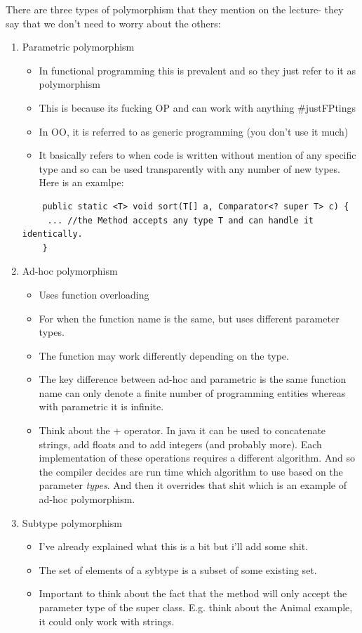 \documentclass{article}
\begin{document}
There are three types of polymorphism that they mention on the lecture- they say that we don't need
to worry about the others:

\begin{enumerate}
\item Parametric polymorphism
	\begin{itemize}
	  \item In functional programming this is prevalent and so they just refer to it as polymorphism
	  \item This is because its fucking OP and can work with anything \#justFPtings
	  \item In OO, it is referred to as generic programming (you don't use it much)
	  \item It basically refers to when code is written without mention of any specific type and so
		can be used transparently with any number of new types. Here is an examlpe:
	\end{itemize}
     \begin{lstlisting}
	public static <T> void sort(T[] a, Comparator<? super T> c) {
 	 ... //the Method accepts any type T and can handle it identically.
	}
     \end{lstlisting} 

\item Ad-hoc polymorphism
	\begin{itemize}
		\item Uses function overloading
		\item For when the function name is the same, but uses different parameter types.
		\item The function may work differently depending on the type.
		\item The key difference between ad-hoc and parametric is the same function name can only
		      denote a finite number of programming entities whereas with parametric it is infinite.
	        \item Think about the + operator. In java it can be used to concatenate strings, add floats and
		      to add integers (and probably more). Each implementation of these operations requires a 
		      different algorithm. And so the compiler decides are run time which algorithm to use
		      based on the parameter \emph{types}. And then it overrides that shit which is an example
		      of ad-hoc polymorphism.
	\end{itemize}
\item Subtype polymorphism
	\begin{itemize}
		\item I've already explained what this is a bit but i'll add some shit.
		\item The set of elements of a sybtype is a subset of some existing set.
		\item Important to think about the fact that the method will only accept the parameter
		      type of the super class. E.g. think about the Animal example, it could only
		      work with strings.
	\end{itemize}
\end{enumerate}
\end{document}
